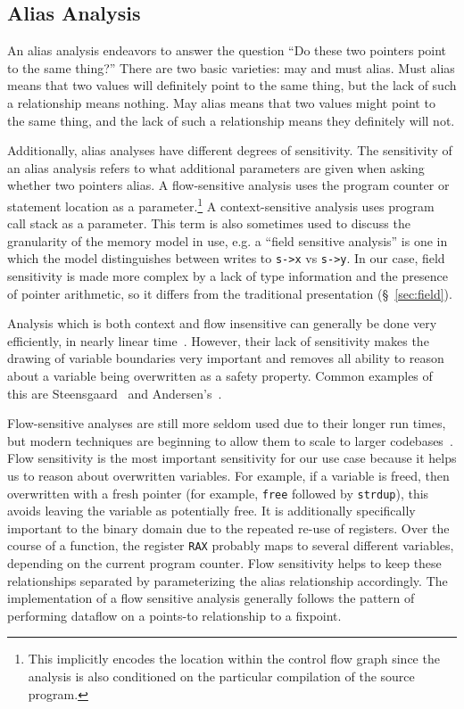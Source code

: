 \subsection{Alias Analysis}
An alias analysis endeavors to answer the question ``Do these two pointers point to the same thing?''
There are two basic varieties: may and must alias.
Must alias means that two values will definitely point to the same thing, but the lack of such a relationship means nothing.
May alias means that two values might point to the same thing, and the lack of such a relationship means they definitely will not.

Additionally, alias analyses have different degrees of sensitivity.
The sensitivity of an alias analysis refers to what additional parameters are given when asking whether two pointers alias.
A flow-sensitive analysis uses the program counter or statement location as a parameter.\footnote{
This implicitly encodes the location within the control flow graph since the analysis is also conditioned on the particular compilation of the source program.}
A context-sensitive analysis uses program call stack as a parameter.
This term is also sometimes used to discuss the granularity of the memory model in use, e.g. a ``field sensitive analysis'' is one in which the model distinguishes between writes to \texttt{s->x} vs \texttt{s->y}.
In our case, field sensitivity is made more complex by a lack of type information and the presence of pointer arithmetic, so it differs from the traditional presentation (\S~\ref{sec:field}).

Analysis which is both context and flow insensitive can generally be done very efficiently, in nearly linear time~\cite{steensgaard-alias}.
However, their lack of sensitivity makes the drawing of variable boundaries very important and removes all ability to reason about a variable being overwritten as a safety property.
Common examples of this are Steensgaard~\cite{steensgaard-alias} and Andersen's~\cite{andersen-alias}.

Flow-sensitive analyses are still more seldom used due to their longer run times, but modern techniques are beginning to allow them to scale to larger codebases~\cite{sfs}.
Flow sensitivity is the most important sensitivity for our use case because it helps us to reason about overwritten variables.
For example, if a variable is freed, then overwritten with a fresh pointer (for example, \texttt{free} followed by \texttt{strdup}), this avoids leaving the variable as potentially free.
It is additionally specifically important to the binary domain due to the repeated re-use of registers.
Over the course of a function, the register \texttt{RAX} probably maps to several different variables, depending on the current program counter.
Flow sensitivity helps to keep these relationships separated by parameterizing the alias relationship accordingly.
The implementation of a flow sensitive analysis generally follows the pattern of performing dataflow on a points-to relationship to a fixpoint.

